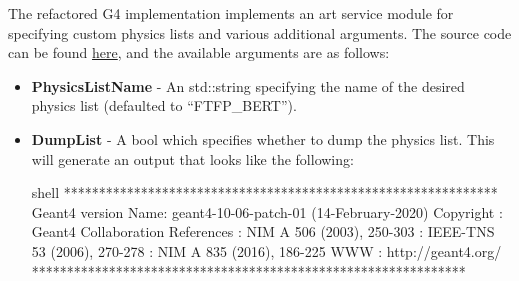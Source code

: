 \documentclass[8pt]{refart}
\begin{document}
 The refactored G4 implementation implements an art service module for specifying custom physics lists and various additional arguments.  The source code can be found \href{https://cdcvs.fnal.gov/redmine/projects/artg4tk/repository/revisions/develop/entry/artg4tk/pluginActions/physicsList/PhysicsList_service.hh}{here}, and the available arguments are as follows:
\begin{itemize}
    \item \textbf{PhysicsListName} - An {\color{magenta}std::string} specifying the name of the desired physics list (defaulted to {\color{red}``FTFP\_BERT''}).
    \item \textbf{DumpList} - A {\color{magenta}bool} which specifies whether to dump the physics list.  This will generate an output that looks like the following:
    \begin{code}{shell}
    **************************************************************
     Geant4 version Name: geant4-10-06-patch-01    (14-February-2020)
                           Copyright : Geant4 Collaboration
                          References : NIM A 506 (2003), 250-303
                                     : IEEE-TNS 53 (2006), 270-278
                                     : NIM A 835 (2016), 186-225
                                 WWW : http://geant4.org/
    **************************************************************
    

\end{code}
\end{itemize}
\end{document}
